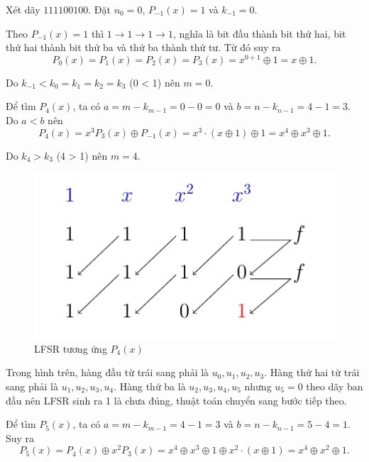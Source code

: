 \begin{example}
	Xét dãy $111100100$. Đặt $n_0 = 0$, $P_{-1}(x) = 1$ và $k_{-1} = 0$.

	Theo $P_{-1}(x) = 1$ thì $1 \to 1 \to 1 \to 1$, nghĩa là bit đầu thành bit thứ hai, bit thứ hai thành bit thứ ba và thứ ba thành thứ tư. Từ đó suy ra
	\begin{equation*}
		P_0 (x) = P_1 (x) = P_2 (x) = P_3 (x) = x^{0+1} \oplus 1 = x \oplus 1.
	\end{equation*}

	Do $k_{-1} < k_0 = k_1 = k_2 = k_3$ (0 < 1) nên $m = 0$.

	Để tìm $P_4(x)$, ta có $a =  m- k_{m-1} = 0 - 0 = 0$ và $b = n - k_{n-1} = 4 - 1 = 3$. Do $a < b$ nên
	\begin{equation*}
		P_4(x) = x^3 P_3(x) \oplus P_{-1}(x) = x^3 \cdot (x \oplus 1) \oplus 1 = x^4 \oplus x^3 \oplus 1.
	\end{equation*}
	
	Do $k_4 > k_3$ (4 > 1) nên $m = 4$.

	\begin{figure}[htb]
		\centering
		\includegraphics[page=1]{figures/berlekamp_massey.pdf}
		\caption{LFSR tương ứng $P_4(x)$}
	\end{figure}
	
	Trong hình trên, hàng đầu từ trái sang phải là $u_0, u_1, u_2, u_3$. Hàng thứ hai từ trái sang phải là $u_1, u_2, u_3, u_4$. Hàng thứ ba là $u_2, u_3, u_4, u_5$ nhưng $u_5 = 0$ theo dãy ban đầu nên LFSR sinh ra 1 là chưa đúng, thuật toán chuyển sang bước tiếp theo.

	Để tìm $P_5(x)$, ta có $a = m - k_{m-1} = 4 - 1 = 3$ và $b = n - k_{n-1} = 5 - 4 = 1$. Suy ra
	\begin{equation*}
		P_5(x) = P_4(x) \oplus x^2 P_3 (x) = x^4 \oplus x^3 \oplus 1 \oplus x^2 \cdot (x \oplus 1) = x^4 \oplus x^2 \oplus 1.
	\end{equation*}


\end{example}

